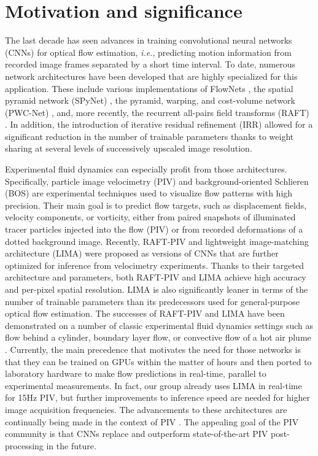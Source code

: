 \documentclass[a4paper,fleqn]{cas-dc}
\begin{document}
\section{Motivation and significance\label{sec:introduction}}

The last decade has seen advances in training convolutional neural networks (CNNs) for optical flow estimation, \textit{i.e.}, predicting motion information from recorded image frames separated by a short time interval. To date, numerous network architectures have been developed that are highly specialized for this application. These include various implementations of FlowNets \citep{dosovitskiy2015flownet, ilg2017flownet, hui2018liteflownet}, the spatial pyramid network (SPyNet) \cite{ranjan2017optical}, the pyramid, warping, and cost-volume network (PWC-Net) \cite{sun2018pwc}, and, more recently, the recurrent all-pairs field transforms (RAFT) \cite{teed2020raft}. In addition, the introduction of iterative residual refinement (IRR) \cite{hur2019iterative} allowed for a significant reduction in the number of trainable parameters thanks to weight sharing at several levels of successively upscaled image resolution.

Experimental fluid dynamics can especially profit from those architectures. Specifically, particle image velocimetry (PIV) and background-oriented Schlieren (BOS) are experimental techniques used to visualize flow patterns with high precision. Their main goal is to predict flow targets, such as displacement fields, velocity components, or vorticity, either from paired snapshots of illuminated tracer particles injected into the flow (PIV) or from recorded deformations of a dotted background image. Recently, RAFT-PIV \cite{lagemann2021deep} and lightweight image-matching architecture (LIMA) \citep{manickathan2023lightweight} were proposed as versions of CNNs that are further optimized for inference from velocimetry experiments. Thanks to their targeted architecture and parameters, both RAFT-PIV and LIMA achieve high accuracy and per-pixel spatial resolution. LIMA is also significantly leaner in terms of the number of trainable parameters than its predecessors used for general-purpose optical flow estimation. 
The successes of RAFT-PIV and LIMA have been demonstrated on a number of classic experimental fluid dynamics settings such as flow behind a cylinder, boundary layer flow, or convective flow of a hot air plume \cite{mucignat2023lightweight}. Currently, the main precedence that motivates the need for those networks is that they can be trained on GPUs within the matter of hours and then ported to laboratory hardware to make flow predictions in real-time, parallel to experimental measurements. In fact, our group already uses LIMA in real-time for 15Hz PIV, but further improvements to inference speed are needed for higher image acquisition frequencies.
The advancements to these architectures are continually being made in the context of PIV \citep{shan2024lightweight, elrefaie2024site}. The appealing goal of the PIV community is that CNNs replace and outperform state-of-the-art PIV post-processing in the future.
\end{document}
